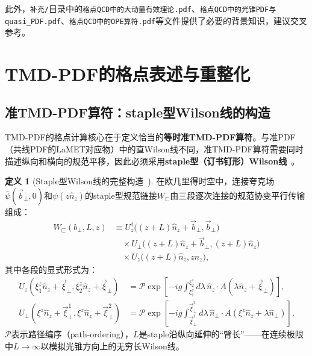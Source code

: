 \documentclass[12pt,a4paper]{ctexart}
\theoremstyle{definition}
\newtheorem{definition}{定义}[section]
\begin{document}
此外，\texttt{补充/}目录中的\verb|格点QCD中的大动量有效理论.pdf|、\verb|格点QCD中的光锥PDF与quasi_PDF.pdf|、\verb|格点QCD中的OPE算符.pdf|等文件提供了必要的背景知识，建议交叉参考。

\section{TMD-PDF的格点表述与重整化}

\subsection{准TMD-PDF算符：staple型Wilson线的构造}

TMD-PDF的格点计算核心在于定义恰当的\textbf{等时准TMD-PDF算符}。与准PDF（共线PDF的LaMET对应物）中的直Wilson线不同，准TMD-PDF算符需要同时描述纵向和横向的规范平移，因此必须采用\textbf{staple型（订书钉形）Wilson线}~\cite{He2024unpolTMD,Zhang2022renormTMD,Ji2013Euclidean}。

\begin{definition}[Staple型Wilson线的完整构造~\cite{Zhang2022renormTMD}]
在欧几里得时空中，连接夸克场$\bar\psi(\vec{b}_\perp, 0)$和$\psi(z\hat{n}_z)$的staple型规范链接$W_{\sqsubset}$由三段逐次连接的规范协变平行传输组成：
\begin{equation}
\begin{aligned}
W_{\sqsubset}(b_\perp, L, z) &\equiv U_z^\dagger\big((z+L)\hat{n}_z + \vec{b}_\perp, \vec{b}_\perp\big) \\
&\quad \times U_\perp\big((z+L)\hat{n}_z + \vec{b}_\perp, (z+L)\hat{n}_z\big) \\
&\quad \times U_z\big((z+L)\hat{n}_z, z\hat{n}_z\big),
\end{aligned}
\label{eq:staple_Wilson_full}
\end{equation}
其中各段的显式形式为：
\begin{align}
U_z(\xi_1^z \hat{n}_z + \vec{\xi}_\perp, \xi_2^z \hat{n}_z + \vec{\xi}_\perp) &= \mathcal{P}\exp\left[-ig\int_{\xi_1^z}^{\xi_2^z} d\lambda\, \hat{n}_z \cdot A(\lambda\hat{n}_z + \vec{\xi}_\perp)\right], \label{eq:Uz} \\
U_\perp(\xi^z \hat{n}_z + \vec{\xi}_\perp^1, \xi^z \hat{n}_z + \vec{\xi}_\perp^2) &= \mathcal{P}\exp\left[-ig\int_{\vec{\xi}_\perp^1}^{\vec{\xi}_\perp^2} d\lambda\, \hat{n}_\perp \cdot A(\xi^z\hat{n}_z + \lambda\hat{n}_\perp)\right]. \label{eq:Uperp}
\end{align}
$\mathcal{P}$表示路径编序（path-ordering），$L$是staple沿纵向延伸的``臂长''——在连续极限中$L\to\infty$以模拟光锥方向上的无穷长Wilson线。
\end{definition}
\end{document}
